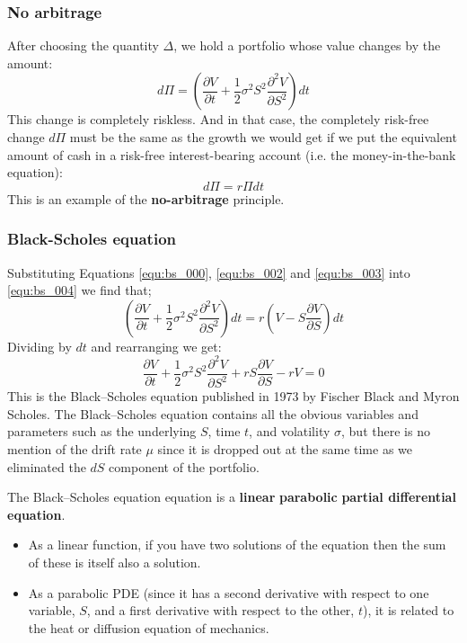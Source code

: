 \subsubsection{No arbitrage}
After choosing the quantity $\Delta$, we hold a portfolio whose value changes by the amount:
\begin{equation}
    d\Pi = \left( \frac{\partial V}{\partial t} + \frac{1}{2} \sigma^2 S^2 \frac{\partial^2 V}{\partial S^2} \right) dt
    \label{equ:bs_003}
\end{equation}
This change is completely riskless. And in that case, the completely risk-free change $d\Pi$ must be the same as the growth we would get if we put the equivalent amount of cash in a risk-free interest-bearing account (i.e. the money-in-the-bank equation):
\begin{equation}
    d\Pi = r \Pi dt
    \label{equ:bs_004}
\end{equation}
This is an example of the \textbf{no-arbitrage} principle.



\subsubsection{Black-Scholes equation}
Substituting Equations \ref{equ:bs_000}, \ref{equ:bs_002} and \ref{equ:bs_003} into \ref{equ:bs_004} we find that;
\begin{equation}
    \left( \frac{\partial V}{\partial t} + \frac{1}{2} \sigma^2 S^2 \frac{\partial^2 V}{\partial S^2} \right) dt = r \left( V - S \frac{\partial V}{\partial S} \right) dt
\end{equation}
Dividing by $dt$ and rearranging we get:
\begin{equation}
    \frac{\partial V}{\partial t} + \frac{1}{2} \sigma^2 S^2 \frac{\partial^2 V}{\partial S^2} + rS \frac{\partial V}{\partial S} - rV = 0
    \label{equ:bs_original}
\end{equation}
This is the Black–Scholes equation published in 1973 by Fischer Black and Myron Scholes. The Black–Scholes equation contains all the obvious variables and parameters such as the underlying $S$, time $t$, and volatility $\sigma$, but there is no mention of the drift rate $\mu$ since it is dropped out at the same time as we eliminated the $dS$ component of the portfolio.

The Black–Scholes equation equation is a \textbf{linear} \textbf{parabolic} \textbf{partial differential equation}. 
\begin{itemize}
    \item As a linear function, if you have two solutions of the equation then the sum of these is itself also a solution.
    \item As a parabolic PDE (since it has a second derivative with respect to one variable, $S$, and a first derivative with respect to the other, $t$), it is related to the heat or diffusion equation of mechanics.
\end{itemize}   

